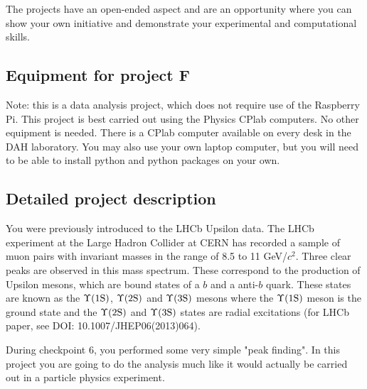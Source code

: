 The projects have an open-ended aspect and are an opportunity where you can show your own initiative and demonstrate your experimental and computational skills. 

\subsection{Equipment for project F}

Note: this is a data analysis project, which does not require use of the Raspberry Pi.
This project is best carried out using the Physics CPlab computers. No other equipment is needed.  There is a CPlab computer available on every desk in the DAH laboratory.
You may also use your own laptop computer, but you will need to be able to install
python and python packages on your own. 


\subsection{Detailed project description}
  
You were previously introduced to the LHCb Upsilon data. 
The LHCb experiment at the Large Hadron Collider at CERN has recorded a sample of muon pairs with invariant masses in the range of 8.5 to 11 GeV/$c^2$. Three clear peaks are observed in this mass spectrum. These correspond to the production of Upsilon mesons, which are bound states of a $b$ and a anti-$b$ quark. These states are known as the $\Upsilon \rm (1S)$, $\Upsilon \rm (2S)$ and $\Upsilon \rm (3S)$ mesons where the $\Upsilon \rm (1S)$ meson is the ground state and the $\Upsilon \rm (2S)$  and $\Upsilon \rm (3S)$  states are radial excitations (for LHCb paper, see {DOI: 10.1007/JHEP06(2013)064).}


During checkpoint 6, you performed some very simple "peak finding". In this project you are going to do the analysis much like it would actually be carried out in a particle physics experiment.

